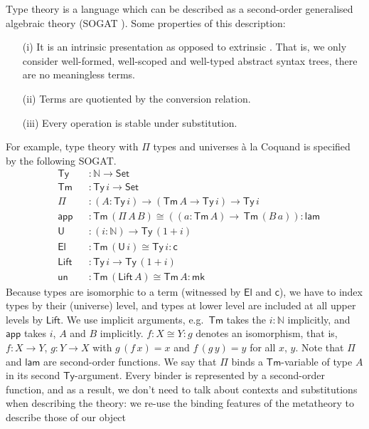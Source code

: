 \documentclass[sigplan,10pt,anonymous,review]{acmart}\settopmatter{printfolios=true,printccs=false,printacmref=false}
\newcommand{\ra}{\rightarrow}
\newcommand{\Set}{\mathsf{Set}}
\newcommand{\Ty}{\mathsf{Ty}}
\newcommand{\Tm}{\mathsf{Tm}}
\newcommand{\N}{\mathbb{N}}
\newcommand{\lam}{\mathsf{lam}}
\newcommand{\app}{\mathsf{app}}
\newcommand{\U}{\mathsf{U}}
\newcommand{\El}{\mathsf{El}}
\newcommand{\cd}{\mathsf{c}}
\newcommand{\Lift}{\mathsf{Lift}}
\newcommand{\mk}{\mathsf{mk}}
\newcommand{\un}{\mathsf{un}}
\begin{document}
Type theory is a language which can be described as a second-order
generalised algebraic theory (SOGAT
\cite{DBLP:conf/fscd/KaposiX24}). Some properties of this description:
\begin{enumerate}
\item[(i)] It is an intrinsic presentation
  \cite{DBLP:conf/csl/AltenkirchR99,DBLP:conf/popl/AltenkirchK16} as
  opposed to extrinsic \cite{abel2013normalization,theo}. That is, we
  only consider well-formed, well-scoped and well-typed abstract
  syntax trees, there are no meaningless terms.
\item[(ii)] Terms are quotiented by the conversion relation.
\item[(iii)] Every operation is stable under substitution.
\end{enumerate}
For example, type theory with $\Pi$ types and universes {\`a} la
Coquand \cite{coquandUniverse} is specified by the following SOGAT.
\begin{equation}\label{eq:tt}
\begin{alignedat}{10}
  & \Ty && : \N\ra\Set \\
  & \Tm && : \Ty\,i\ra\Set \\
  & \Pi && : (A:\Ty\,i)\ra(\Tm\,A\ra\Ty\,i)\ra\Ty\,i \\
  & \app && : \Tm\,(\Pi\,A\,B)\cong((a:\Tm\,A)\ra\,\Tm\,(B\,a)): \lam \\
  & \U && : (i:\N)\ra\Ty\,(1+i) \\
  & \El && : \Tm\,(\U\,i)\cong\Ty\,i : \cd \\
  & \Lift && : \Ty\,i\ra\Ty\,(1+i) \\
  & \un && : \Tm\,(\Lift\,A)\cong\Tm\,A : \mk
\end{alignedat}
\end{equation}
Because types are isomorphic to a term (witnessed by $\El$ and $\cd$),
we have to index types by their (universe) level, and types at lower
level are included at all upper levels by $\Lift$. We use implicit
arguments, e.g.\ $\Tm$ takes the $i:\N$ implicitly, and $\app$ takes
$i$, $A$ and $B$ implicitly. $f : X \cong Y : g$ denotes an
isomorphism, that is, $f : X\ra Y$, $g:Y\ra X$ with $g\,(f\,x) = x$
and $f\,(g\,y) = y$ for all $x$, $y$. Note that $\Pi$ and $\lam$ are
second-order functions. We say that $\Pi$ binds a $\Tm$-variable of
type $A$ in its second $\Ty$-argument. Every binder is represented by
a second-order function, and as a result, we don't need to talk about
contexts and substitutions when describing the theory: we re-use the
binding features of the metatheory to describe those of our object
\end{document}
